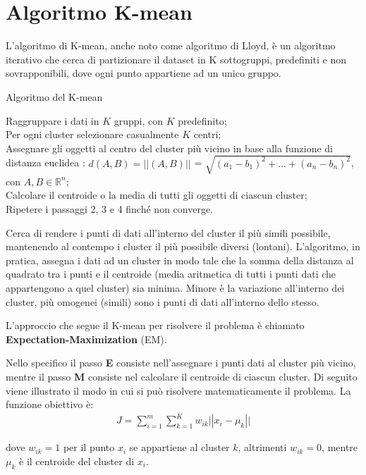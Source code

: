 \section{Algoritmo K-mean}

L'algoritmo di K-mean, anche noto come algoritmo di Lloyd, è un algoritmo iterativo che cerca di partizionare il dataset in K sottogruppi, predefiniti e non sovrapponibili, dove ogni punto appartiene ad un unico gruppo. 
\begin{algorithm}[h]
	\caption{Algoritmo del K-mean}
	Raggruppare i dati in $K$ gruppi, con $K$ predefinito;\\
	Per ogni cluster selezionare casualmente $K$ centri;\\
	Assegnare gli oggetti al centro del cluster più vicino in base alla funzione di distanza euclidea : $d(A,B) = \vert|(A,B)|\vert$ = $\sqrt{(a_1 - b_1)^2 + \dots + (a_n - b_n)^2}$, con $A,B \in \mathbb{R}^n$;\\
	Calcolare il centroide o la media di tutti gli oggetti di ciascun cluster;\\
	Ripetere i passaggi 2, 3 e 4 finché non converge.\\
	
\end{algorithm}

Cerca di rendere i punti di dati all'interno del cluster il più simili possibile, mantenendo al contempo i cluster il più possibile diversi (lontani).
L'algoritmo, in pratica, assegna i dati ad un cluster in modo tale che la somma della distanza al quadrato tra i punti e il centroide (media aritmetica di tutti i punti dati che appartengono a quel cluster) sia minima. Minore è la variazione all'interno dei cluster, più omogenei (simili) sono i punti di dati all'interno dello stesso.


L'approccio che segue il K-mean per risolvere il problema è chiamato \textbf{Expectation-Maximization} (EM).

Nello specifico il passo \textbf{E} consiste nell'assegnare i punti dati al cluster più vicino, mentre il passo \textbf{M} consiste nel calcolare il centroide di ciascun cluster. Di seguito viene illustrato il modo in cui si può risolvere matematicamente il problema.
La funzione obiettivo è:
\begin{align*}
	J = \sum_{i=1}^{m} \sum_{k=1}^{K} w_{ik} \vert|x_i - \mu_k|\vert
\end{align*}

dove $w_{ik}=1$ per il punto $x_i$ se appartiene al cluster $k$, altrimenti $w_{ik}=0$, mentre $\mu_k$ è il centroide del cluster di $x_i$.

